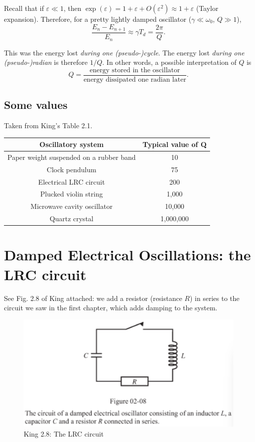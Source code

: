 \documentclass[11pt]{article}
\makeatletter
\def\maxwidth{\ifdim\Gin@nat@width>\linewidth\linewidth
    \else\Gin@nat@width\fi}
\let\Oldincludegraphics\includegraphics
\renewcommand{\includegraphics}[1]{\Oldincludegraphics[width=.8\maxwidth]{#1}}
\makeatother
\begin{document}
Recall that if \(\varepsilon \ll 1\), then
\(\exp(\varepsilon) = 1 + \varepsilon + O(\varepsilon^2) \approx 1 + \varepsilon\)
(Taylor expansion). Therefore, for a pretty lightly damped oscillator
(\(\gamma \ll \omega_0\), \(Q \gg 1\)),
\[ \frac{E_{n} - E_{n+1}}{E_n} \approx \gamma T_d = \frac{2\pi}{Q}.\]

This was the energy lost \emph{during one (pseudo-)cycle}. The energy
lost \emph{during one (pseudo-)radian} is therefore \(1/Q\). In other
words, a possible interpretation of \(Q\) is
\[ Q  = \frac{\textrm{energy stored in the oscillator}}{\textrm{energy dissipated one radian later}}. \]

    \hypertarget{some-values}{%
\subsection{Some values}\label{some-values}}

Taken from King's Table 2.1.

\begin{longtable}[]{@{}cc@{}}
\toprule
Oscillatory system & Typical value of Q\tabularnewline
\midrule
\endhead
Paper weight suspended on a rubber band & 10\tabularnewline
Clock pendulum & 75\tabularnewline
Electrical LRC circuit & 200\tabularnewline
Plucked violin string & 1,000\tabularnewline
Microwave cavity oscillator & 10,000\tabularnewline
Quartz crystal & 1,000,000\tabularnewline
\bottomrule
\end{longtable}

    \hypertarget{damped-electrical-oscillations-the-lrc-circuit}{%
\section{Damped Electrical Oscillations: the LRC
circuit}\label{damped-electrical-oscillations-the-lrc-circuit}}

See Fig. 2.8 of King attached: we add a resistor (resistance \(R\)) in
series to the circuit we saw in the first chapter, which adds damping to
the system.

\begin{figure}
\centering
\includegraphics{LRC.png}
\caption{King 2.8: The LRC circuit}
\end{figure}
\end{document}
